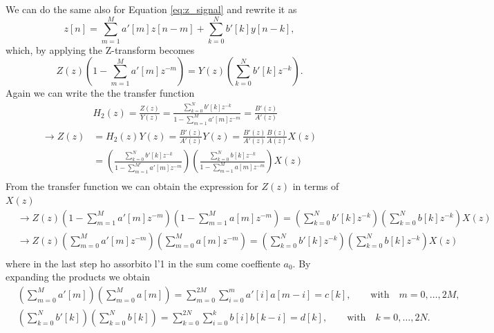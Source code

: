 We can do the same also for Equation \ref{eq:z_signal} and rewrite it as 
\begin{equation}\label{eq:z_signal1}
    z[n] = \sum_{m=1}^{M} a'[m]z[n-m] + \sum_{k=0}^{N} b'[k] y[n-k],
\end{equation}
which, by applying the Z-transform becomes
\begin{equation}\label{eq:z_signal_transform}
    Z(z)\left(1 - \sum_{m=1}^{M} a'[m] z^{-m} \right) = Y(z) \left( \sum_{k=0}^{N} b'[k] z^{-k} \right).
\end{equation}
Again we can write the the transfer function
\begin{align}
    &H_2(z) = \frac{Z(z)}{Y(z)} = \frac{\sum_{k=0}^{N} b'[k] z^{-k}}{1 - \sum_{m=1}^{M} a'[m] z^{-m}} = \frac{B'(z)}{A'(z)} \\
    \rightarrow Z(z) &= H_2(z)Y(z) = \frac{B'(z)}{A'(z)}Y(z) = \frac{B'(z)}{A'(z)} \frac{B(z)}{A(z)} X(z)\\ \label{eq:transfer2}
    &= \left( \frac{\sum_{k=0}^{N} b'[k] z^{-k}}{1 - \sum_{m=1}^{M'} a'[m] z^{-m}} \right) \left( \frac{\sum_{k=0}^{N} b[k] z^{-k}}{1 - \sum_{m=1}^{M} a[m] z^{-m}} \right) X(z)\\
\end{align}
From the transfer function we can obtain the expression for $Z(z)$ in terms of $X(z)$ 
\begin{align}
    & \rightarrow Z(z) \left(1 - \sum_{m=1}^{M} a'[m] z^{-m} \right) \left(1 - \sum_{m=1}^{M} a[m] z^{-m} \right) = \left( \sum_{k=0}^{N} b'[k] z^{-k} \right) \left( \sum_{k=0}^{N} b[k] z^{-k} \right) X(z) \\
    & \rightarrow Z(z) \left( \sum_{m=0}^{M} a'[m] z^{-m} \right) \left( \sum_{m=0}^{M} a[m] z^{-m} \right) = \left( \sum_{k=0}^{N} b'[k] z^{-k} \right) \left( \sum_{k=0}^{N} b[k] z^{-k} \right) X(z)\\ \label{eq:Zz}
\end{align}
where in the last step  ho assorbito l'1 in the sum come coeffiente $a_0$. By expanding the products we obtain
\begin{align}
    & \left( \sum_{m=0}^{M} a'[m] \right) \left( \sum_{m=0}^{M} a[m] \right) = \sum_{m=0}^{2M}\sum_{i=0}^{m} a'[i] a[m - i] = c[k], \quad\quad \text{with}\quad m = 0, \dots, 2M,\\ \label{eq:ck}
    & \left( \sum_{k=0}^{N} b'[k] \right) \left( \sum_{k=0}^{N} b[k] \right) = \sum_{k=0}^{2N} \sum_{i=0}^{k} b[i] b[k-i] = d[k], \quad\quad \text{with}\quad k = 0, \dots, 2N.\\ \label{eq:dk}
\end{align}

